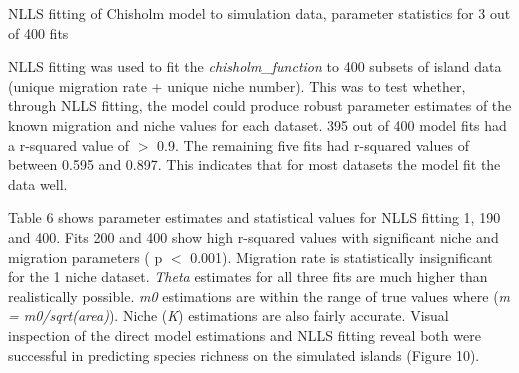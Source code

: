 \documentclass{article}
\begin{document}
\begin{table}[h!]
\caption{NLLS fitting of Chisholm model to simulation data, parameter statistics for 3 out of 400 fits}
\centering
{}
   \end{table}\bigskip
   
\noindent NLLS fitting was used to fit the \textit{chisholm\_function} to 400 subsets of island data (unique migration rate + unique niche number). This was to test whether, through NLLS fitting, the model could produce robust parameter estimates of the known migration and niche values for each dataset. 395 out of 400 model fits had a r-squared value of $>$ 0.9. The remaining five fits had r-squared values of between 0.595 and 0.897. This indicates that for most datasets the model fit the data well. \bigskip

\noindent Table 6 shows parameter estimates and statistical values for NLLS fitting 1, 190 and 400. Fits 200 and 400 show high r-squared values with significant niche and migration parameters ( p $<$ 0.001). Migration rate is statistically insignificant for the 1 niche dataset. \textit{Theta} estimates for all three fits are much higher than realistically possible. \textit{m0} estimations are within the range of true values where (\textit{m = m0/sqrt(area)}). Niche (\textit{K}) estimations are also fairly accurate. Visual inspection of the direct model estimations and NLLS fitting reveal both were successful in predicting species richness on the simulated islands (Figure 10).
\end{document}
